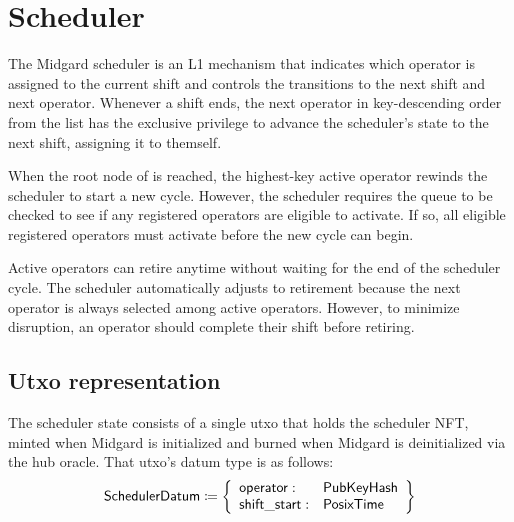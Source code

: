\documentclass[../midgard.tex]{subfiles}
\begin{document}
\section{Scheduler}
\label{h:scheduler}

The Midgard scheduler is an L1 mechanism that indicates which operator is assigned to the current shift and controls the transitions to the next shift and next operator. Whenever a shift ends, the next operator in key-descending order from the  list has the exclusive privilege to advance the scheduler's state to the next shift, assigning it to themself.

When the root node of  is reached, the highest-key active operator rewinds the scheduler to start a new cycle. However, the scheduler requires the  queue to be checked to see if any registered operators are eligible to activate. If so, all eligible registered operators must activate before the new cycle can begin.

Active operators can retire anytime without waiting for the end of the scheduler cycle. The scheduler automatically adjusts to retirement because the next operator is always selected among active operators. However, to minimize disruption, an operator should complete their shift before retiring.

\todo

\subsection{Utxo representation}
\label{h:scheduler-utxo-representation}

The scheduler state consists of a single utxo that holds the scheduler NFT, minted when Midgard is initialized and burned when Midgard is deinitialized via the hub oracle. That utxo's datum type is as follows:
\begin{equation*}
    \mathsf{SchedulerDatum} \coloneq \left\{
    \begin{array}{ll}
        \mathsf{operator}  : & \mathsf{PubKeyHash} \\
        \mathsf{shift\_start} : & \mathsf{PosixTime}
    \end{array} \right\}
\end{equation*}
\end{document}
